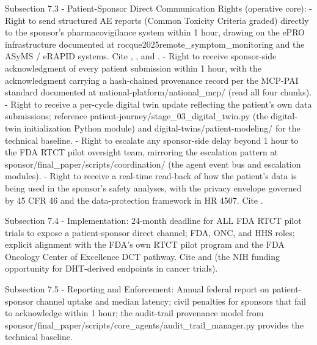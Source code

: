 Subsection 7.3 - Patient-Sponsor Direct Communication Rights
(operative core):
- Right to send structured AE reports (Common Toxicity Criteria
  graded) directly to the sponsor's pharmacovigilance system within
  1 hour, drawing on the ePRO infrastructure documented at
  rocque2025remote\_symptom\_monitoring \cite{rocque2025remote_symptom_monitoring}
  and the ASyMS / eRAPID systems. Cite \cite{kearney2009asyms},
  \cite{maguire2017esmart}, and \cite{absolom2021erapid}.
- Right to receive sponsor-side acknowledgment of every patient
  submission within 1 hour, with the acknowledgment carrying a
  hash-chained provenance record per the MCP-PAI standard documented
  at national-platform/national\_mcp/ (read all four chunks).
- Right to receive a per-cycle digital twin update reflecting the
  patient's own data submissions; reference
  patient-journey/stage\_03\_digital\_twin.py (the digital-twin
  initialization Python module) and digital-twins/patient-modeling/
  for the technical baseline.
- Right to escalate any sponsor-side delay beyond 1 hour to the FDA
  RTCT pilot oversight team, mirroring the escalation pattern at
  sponsor/final\_paper/scripts/coordination/ (the agent event bus and
  escalation modules).
- Right to receive a real-time read-back of how the patient's data
  is being used in the sponsor's safety analyses, with the privacy
  envelope governed by 45 CFR 46 and the data-protection framework
  in HR 4507. Cite \cite{hhs_45cfr46_protection_human_subjects}.

Subsection 7.4 - Implementation: 24-month deadline for ALL FDA RTCT
pilot trials to expose a patient-sponsor direct channel; FDA, ONC,
and HHS roles; explicit alignment with the FDA's own RTCT pilot
program and the FDA Oncology Center of Excellence DCT pathway. Cite
\cite{fda_oce_advancing_oncology_dct_2024} and
\cite{nih_par25_170_dht_endpoints} (the NIH funding opportunity for
DHT-derived endpoints in cancer trials).

Subsection 7.5 - Reporting and Enforcement: Annual federal report on
patient-sponsor channel uptake and median latency; civil penalties
for sponsors that fail to acknowledge within 1 hour; the audit-trail
provenance model from
sponsor/final\_paper/scripts/core\_agents/audit\_trail\_manager.py
provides the technical baseline.

